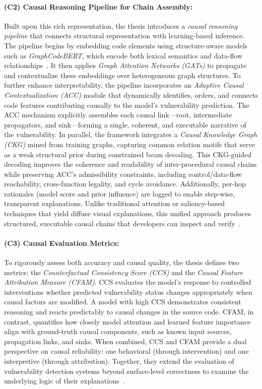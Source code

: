 \documentclass{buthesis}
\begin{document}
\paragraph{(C2) Causal Reasoning Pipeline for Chain Assembly:}
Built upon this rich representation, the thesis introduces a \emph{causal reasoning pipeline} that connects structural representation with learning-based inference. The pipeline begins by embedding code elements using structure-aware models such as \emph{GraphCodeBERT}, which encode both lexical semantics and data-flow relationships~\cite{guo2021graphcodebert}. It then applies \emph{Graph Attention Networks (GATs)} to propagate and contextualize these embeddings over heterogeneous graph structures. To further enhance interpretability, the pipeline incorporates an \emph{Adaptive Causal Contextualization (ACC)} module that dynamically identifies, orders, and connects code features contributing causally to the model’s vulnerability prediction. The ACC mechanism explicitly assembles each causal link—root, intermediate propagators, and sink—forming a single, coherent, and executable narrative of the vulnerability. In parallel, the framework integrates a \emph{Causal Knowledge Graph (CKG)} mined from training graphs, capturing common relation motifs that serve as a weak structural prior during constrained beam decoding. This CKG-guided decoding improves the coherence and readability of inter-procedural causal chains while preserving ACC’s admissibility constraints, including control/data-flow reachability, cross-function legality, and cycle avoidance. Additionally, per-hop rationales (model score and prior influence) are logged to enable step-wise, transparent explanations. Unlike traditional attention or saliency-based techniques that yield diffuse visual explanations, this unified approach produces structured, executable causal chains that developers can inspect and verify~\cite{Zhou2019}.


\paragraph{(C3) Causal Evaluation Metrics:}
To rigorously assess both accuracy and causal quality, the thesis defines two metrics: the \emph{Counterfactual Consistency Score (CCS)} and the \emph{Causal Feature Attribution Measure (CFAM)}. CCS evaluates the model’s response to controlled interventions whether predicted vulnerability status changes appropriately when causal factors are modified. A model with high CCS demonstrates consistent reasoning and reacts predictably to causal changes in the source code. CFAM, in contrast, quantifies how closely model attention and learned feature importance align with ground-truth causal components, such as known input sources, propagation links, and sinks. When combined, CCS and CFAM provide a dual perspective on causal reliability: one behavioral (through intervention) and one interpretive (through attribution). Together, they extend the evaluation of vulnerability detection systems beyond surface-level correctness to examine the underlying logic of their explanations~\cite{Cao2024ICSE,Chu2024ISSTA}.
\end{document}
